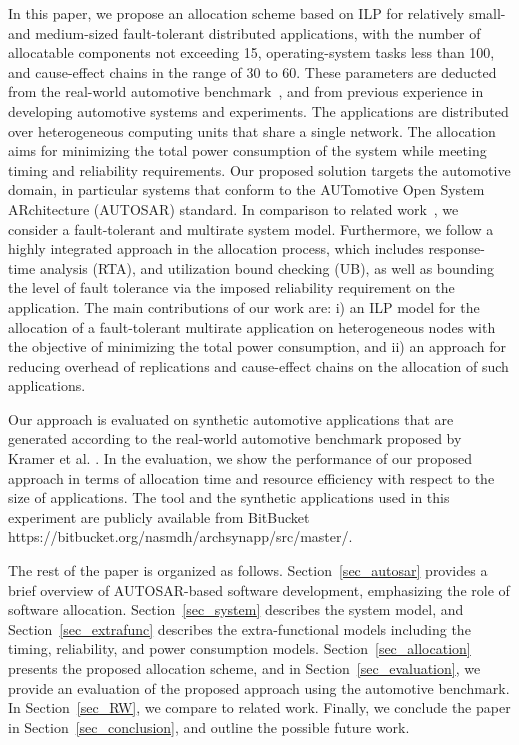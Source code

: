 In this paper, we propose an allocation scheme based on ILP for relatively small- and medium-sized fault-tolerant distributed applications, with the number of allocatable components not exceeding 15, operating-system tasks less than 100, and cause-effect chains in the range of 30 to 60. These parameters are deducted from the real-world automotive benchmark~\cite{Kramer2015RealFree}, and from previous experience in developing automotive systems and experiments. The applications are distributed over heterogeneous computing units that share a single network. The allocation aims for minimizing the total power consumption of the system while meeting timing and reliability requirements. Our proposed solution targets the automotive domain, in particular systems that conform to the AUTomotive Open System ARchitecture (AUTOSAR) standard. In comparison to related work~\cite{Wozniak2013AnArchitectures}\cite{vsvogor2014extended}\cite{Saidi2015AnArchitectures}, we consider a fault-tolerant and multirate system model. Furthermore, we follow a highly integrated approach in the allocation process, which includes response-time analysis (RTA), and utilization bound checking (UB), as well as bounding the level of fault tolerance via the imposed reliability requirement on the application. The main contributions of our work are: i) an ILP model for the allocation of a fault-tolerant multirate application on heterogeneous nodes with the objective of minimizing the total power consumption, and ii) an approach for reducing overhead of replications and cause-effect chains on the allocation of such applications.

Our approach is evaluated on synthetic automotive applications that are generated according to the real-world automotive benchmark proposed by Kramer et al. \cite{Kramer2015RealFree}. In the evaluation, we show the performance of our proposed approach in terms of allocation time and resource efficiency with respect to the size of applications. The tool and the synthetic applications used in this experiment are publicly available from BitBucket {\small https://bitbucket.org/nasmdh/archsynapp/src/master/}. 

The rest of the paper is organized as follows. Section~\ref{sec_autosar} provides a brief overview of AUTOSAR-based software development, emphasizing the role of software allocation. Section~\ref{sec_system} describes the system model, and Section~\ref{sec_extrafunc} describes the extra-functional models including the timing, reliability, and power consumption models. Section~\ref{sec_allocation} presents the proposed allocation scheme, and in Section~\ref{sec_evaluation}, we provide an evaluation of the proposed approach using the automotive benchmark. In Section~\ref{sec_RW}, we compare to related work. Finally, we conclude the paper in Section~\ref{sec_conclusion}, and outline the possible future work.

